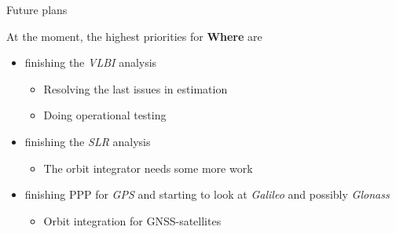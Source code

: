 \documentclass[ignorenonframetext,12pt,t]{beamer}
\providecommand{\tightlist}{%
  \setlength{\itemsep}{0pt}\setlength{\parskip}{0pt}}
\begin{document}
\begin{frame}{Future plans}

At the moment, the highest priorities for \textbf{Where} are

\begin{itemize}
\item
  finishing the \emph{VLBI} analysis

  \begin{itemize}
  \item
    Resolving the last issues in estimation
  \item
    Doing operational testing
  \end{itemize}
\item
  finishing the \emph{SLR} analysis

  \begin{itemize}
  \tightlist
  \item
    The orbit integrator needs some more work
  \end{itemize}
\item
  finishing PPP for \emph{GPS} and starting to look at \emph{Galileo}
  and possibly \emph{Glonass}

  \begin{itemize}
  \tightlist
  \item
    Orbit integration for GNSS-satellites
  \end{itemize}
\end{itemize}

\end{frame}
\end{document}

